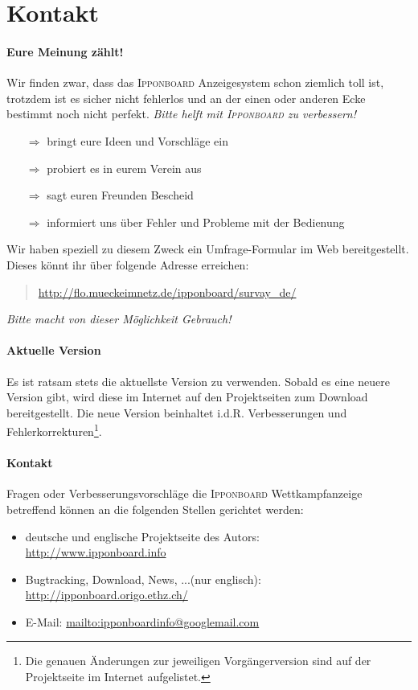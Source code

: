 ﻿\documentclass[11pt,numbers=noenddot]{scrreprt}
\newcommand*{\IB}{\begingroup{\fontspec{Cuprum}\selectfont\textsc{Ipponboard}} \endgroup}
\begin{document}
\newpage
\section{Kontakt}
\paragraph{Eure Meinung zählt!}
Wir finden zwar, dass das \IB Anzeigesystem schon ziemlich toll ist, trotzdem ist es sicher nicht fehlerlos und an der einen oder anderen Ecke bestimmt noch nicht perfekt. \textit{Bitte helft mit \IB zu verbessern!}

\begin{itemize}
	\item[$\Rightarrow$] bringt eure Ideen und Vorschläge ein
	\item[$\Rightarrow$] probiert es in eurem Verein aus
	\item[$\Rightarrow$] sagt euren Freunden Bescheid
	\item[$\Rightarrow$] informiert uns über Fehler und Probleme mit der Bedienung
\end{itemize}
Wir haben speziell zu diesem Zweck ein Umfrage-Formular im Web bereitgestellt. Dieses könnt ihr über folgende Adresse erreichen:
\begin{quote}
	\url{http://flo.mueckeimnetz.de/ipponboard/survay_de/}
\end{quote}
{\parindent 0pt\textit{Bitte macht von dieser Möglichkeit Gebrauch!}}

\paragraph{Aktuelle Version}
Es ist ratsam stets die aktuellste Version zu verwenden. Sobald es eine neuere Version gibt, wird diese im Internet auf den Projektseiten zum Download bereitgestellt. Die neue Version beinhaltet i.d.R. Verbesserungen und Fehlerkorrekturen\footnote{Die genauen Änderungen zur jeweiligen Vorgängerversion sind auf der Projektseite im Internet aufgelistet.}. 

\paragraph{Kontakt}
Fragen oder Verbesserungsvorschläge die \IB Wettkampfanzeige betreffend können an die folgenden Stellen gerichtet werden:
\begin{itemize}
	\item deutsche und englische Projektseite des Autors:\\\url{http://www.ipponboard.info}
	\item Bugtracking, Download, News, ...(nur englisch):\\\url{http://ipponboard.origo.ethz.ch/}
	\item E-Mail: \url{mailto:ipponboardinfo@googlemail.com}
\end{itemize}
\end{document}
